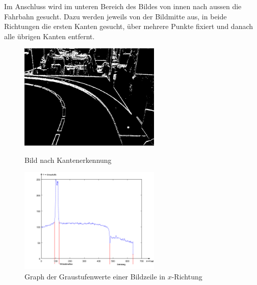 Im Anschluss wird im unteren Bereich des Bildes von innen nach aussen die Fahrbahn gesucht. Dazu werden jeweils von der Bildmitte aus, in beide Richtungen die ersten Kanten gesucht, über mehrere Punkte fixiert und danach alle übrigen Kanten entfernt.\\
\begin{figure}[h!]%
\centering
\includegraphics[width=0.6\textwidth]{03_Loesungskonzept/pictures/Kantengrafik.png}
\caption{Bild nach Kantenerkennung}
\includegraphics[width=0.6\textwidth]{03_Loesungskonzept/pictures/graphPicture.png}
\caption{Graph der Graustufenwerte einer Bildzeile in $x$-Richtung}
\label{fig:grayscale}
\end{figure}\\
